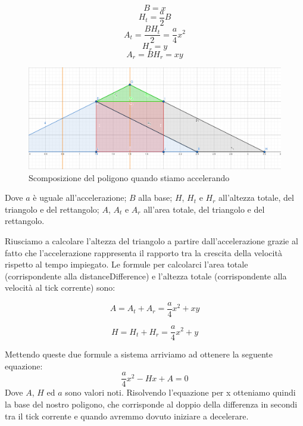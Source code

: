 \documentclass[main.tex]{subfiles}
\begin{document}
\begin{itemize}
    \begin{minipage}{.475\textwidth}
        \[B = x\]
        \[H_t = \frac{a}{2}B\]
        \[A_t = \frac{BH_t}{2} = \frac{a}{4}x^2\]
        \[H_r = y\]
        \[A_r = BH_r = xy\]
    \end{minipage}
    \begin{minipage}{.475\textwidth}
        \begin{figure}[H]
            \centering
            \includegraphics[width=1\linewidth]{img/interpolazione/compensateLateCallAccel2.png}
            \caption{Scomposizione del poligono quando stiamo accelerando}
            \label{fig:4_compensateLateCallAccel2}
        \end{figure}
    \end{minipage}
    
    Dove $a$ è uguale all'accelerazione; $B$ alla base; $H$, $H_t$ e $H_r$ all'altezza totale, del triangolo e del rettangolo; $A$, $A_t$ e $A_r$ all'area totale, del triangolo e del rettangolo.
    
    Riusciamo a calcolare l'altezza del triangolo a partire dall'accelerazione grazie al fatto che l'accelerazione rappresenta il rapporto tra la crescita della velocità rispetto al tempo impiegato.\newline
    Le formule per calcolarci l'area totale (corrispondente alla distanceDifference) e l'altezza totale (corrispondente alla velocità al tick corrente) sono:
    \hspace{2cm}
    
    \begin{minipage}{.45\textwidth}\[A = A_t + A_r = \frac{a}{4}x^2 + xy\]\end{minipage}
    \begin{minipage}{.45\textwidth}\[H = H_t + H_r = \frac{a}{4}x^2 + y\]\end{minipage}
    
    Mettendo queste due formule a sistema arriviamo ad ottenere la seguente equazione:
    \[\frac{a}{4}x^2 - Hx + A = 0\]
    Dove $A$, $H$ ed $a$ sono valori noti. Risolvendo l'equazione per x otteniamo quindi la base del nostro poligono, che corrisponde al doppio della differenza in secondi tra il tick corrente e quando avremmo dovuto iniziare a decelerare.
\end{itemize}
\end{document}
